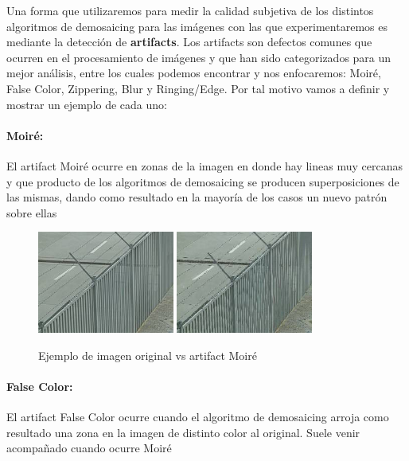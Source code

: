Una forma que utilizaremos para medir la calidad subjetiva de los distintos algoritmos de demosaicing para las imágenes con las que experimentaremos es mediante la detección de \textbf{artifacts}. Los artifacts son defectos comunes que ocurren en el procesamiento de imágenes y que han sido categorizados para un mejor análisis, entre los cuales podemos encontrar y nos enfocaremos: Moiré, False Color, Zippering, Blur y Ringing/Edge. Por tal motivo vamos a definir y mostrar un ejemplo de cada uno:

\paragraph{Moiré:}
El artifact Moiré ocurre en zonas de la imagen en donde hay lineas muy cercanas y que producto de los algoritmos de demosaicing se producen superposiciones de las mismas, dando como resultado en la mayoría de los casos un nuevo patrón sobre ellas

\begin{figure}[htb]
\begin{center}
       \includegraphics[width=0.4\textwidth]{imagenes/moire_original.jpg}
          \hfill
           \includegraphics[width=0.4\textwidth]{imagenes/moire_example.jpg}
          
       Ejemplo de imagen original vs artifact Moiré
       \end{center}

\end{figure}

\paragraph{False Color:}
El artifact False Color ocurre cuando el algoritmo de demosaicing arroja como resultado una zona en la imagen de distinto color al original. Suele venir acompañado cuando ocurre Moiré

